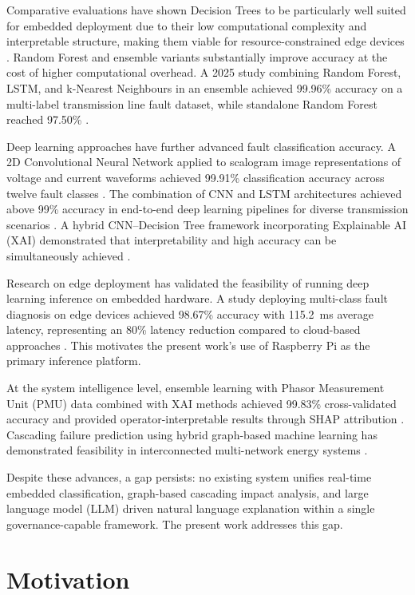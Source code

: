 Comparative evaluations have shown Decision Trees to be particularly well suited for embedded deployment due to their low computational complexity and interpretable structure, making them viable for resource-constrained edge devices \cite{EnergyInformatics2025}. Random Forest and ensemble variants substantially improve accuracy at the cost of higher computational overhead. A 2025 study combining Random Forest, LSTM, and k-Nearest Neighbours in an ensemble achieved 99.96\% accuracy on a multi-label transmission line fault dataset, while standalone Random Forest reached 97.50\% \cite{Anwar2025}.

Deep learning approaches have further advanced fault classification accuracy. A 2D Convolutional Neural Network applied to scalogram image representations of voltage and current waveforms achieved 99.91\% classification accuracy across twelve fault classes \cite{CNN2D2024}. The combination of CNN and LSTM architectures achieved above 99\% accuracy in end-to-end deep learning pipelines for diverse transmission scenarios \cite{LSTM2023}. A hybrid CNN–Decision Tree framework incorporating Explainable AI (XAI) demonstrated that interpretability and high accuracy can be simultaneously achieved \cite{CNNDecisionTree2026}.

Research on edge deployment has validated the feasibility of running deep learning inference on embedded hardware. A study deploying multi-class fault diagnosis on edge devices achieved 98.67\% accuracy with 115.2~ms average latency, representing an 80\% latency reduction compared to cloud-based approaches \cite{EdgeML2024}. This motivates the present work's use of Raspberry Pi as the primary inference platform.

At the system intelligence level, ensemble learning with Phasor Measurement Unit (PMU) data combined with XAI methods achieved 99.83\% cross-validated accuracy and provided operator-interpretable results through SHAP attribution \cite{PMUEnsemble2024}. Cascading failure prediction using hybrid graph-based machine learning has demonstrated feasibility in interconnected multi-network energy systems \cite{HybridCascade2025}.

Despite these advances, a gap persists: no existing system unifies real-time embedded classification, graph-based cascading impact analysis, and large language model (LLM) driven natural language explanation within a single governance-capable framework. The present work addresses this gap.

\section{\textbf{Motivation}}

